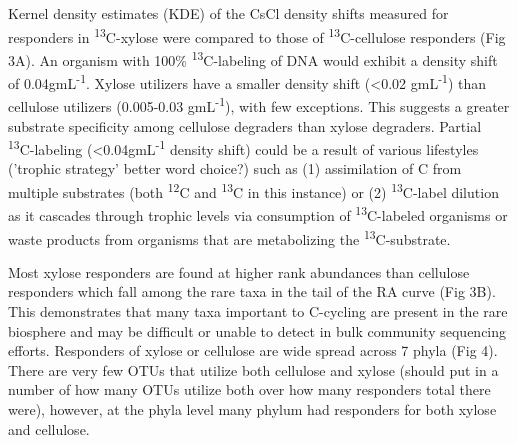 Kernel density estimates (KDE) of the CsCl density shifts measured for responders in \textsuperscript{13}C-xylose were compared to those of \textsuperscript{13}C-cellulose responders (Fig 3A). An organism with 100\% \textsuperscript{13}C-labeling of DNA would exhibit a density shift of 0.04gmL\textsuperscript{-1}. Xylose utilizers have a smaller density shift (<0.02 gmL\textsuperscript{-1}) than cellulose utilizers (0.005-0.03 gmL\textsuperscript{-1}), with few exceptions. This suggests a greater substrate specificity among cellulose degraders than xylose degraders. Partial \textsuperscript{13}C-labeling (<0.04gmL\textsuperscript{-1} density shift) could be a result of various lifestyles ('trophic strategy' better word choice?) such as (1) assimilation of C from multiple substrates (both \textsuperscript{12}C and \textsuperscript{13}C in this instance) or (2) \textsuperscript{13}C-label dilution as it cascades through trophic levels via consumption of \textsuperscript{13}C-labeled organisms or waste products from organisms that are metabolizing the \textsuperscript{13}C-substrate.

Most xylose responders are found at higher rank abundances than cellulose responders which fall among the rare taxa in the tail of the RA curve (Fig 3B). This demonstrates that many taxa important to C-cycling are present in the rare biosphere and may be difficult or unable to detect in bulk community sequencing efforts. Responders of xylose or cellulose are wide spread across 7 phyla (Fig 4). There are very few OTUs that utilize both cellulose and xylose (should put in a number of how many OTUs utilize both over how many responders total there were), however, at the phyla level many phylum had responders for both xylose and cellulose. 

